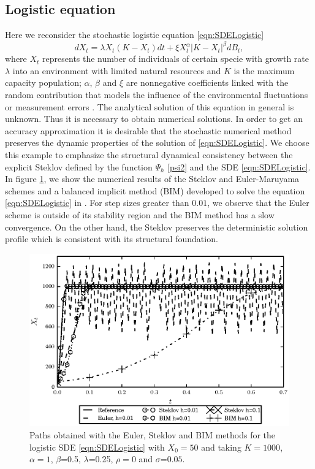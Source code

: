 \subsection{Logistic equation}
  Here we reconsider the stochastic logistic  equation \eqref{eqn:SDELogistic}
  \begin{equation*}
    dX_t= \lambda X_t(K-X_t)dt+ \xi X_t^\alpha|K-X_t|^\beta dB_t,
  \end{equation*}
  where $X_t$  represents the number of individuals of certain specie with growth rate
  $\lambda$ into an environment with limited  natural resources and $K$ is the maximum
  capacity population; $\alpha$, $\beta$ and $\xi$ are nonnegative coefficients linked
  with the random contribution that models the influence of the environmental fluctuations
  or measurement errors \cite{Pasquali2001,Schurz2007,Sun2008}. The analytical solution of
  this equation in general is unknown. Thus it is necessary to obtain  numerical
  solutions. In order to get an accuracy approximation it is desirable that the stochastic
  numerical method  preserves the dynamic properties of the solution of
  \eqref{eqn:SDELogistic}. We choose this example to emphasize the structural dynamical
  consistency between the explicit Steklov defined by the function $\Psi_h$ \eqref{psi2}
  and the SDE \eqref{eqn:SDELogistic}. In figure \ref{fig:PathsEDELog}, we  
  show the numerical results of the  Steklov and Euler-Maruyama schemes and a
  balanced implicit method (BIM) developed to solve the equation \eqref{eqn:SDELogistic} in 
  \cite{Schurz2007}. For step sizes greater than $\num{0.01}$,
  we observe that the Euler scheme is outside of its stability region and the BIM method has
  a slow convergence. On the other hand,
  the Steklov preserves the deterministic solution profile which is consistent with its
  structural foundation.
  \begin{figure}[h!]
    \hspace*{-0.2cm}\includegraphics{./papers/paperA/figures/fig1.eps}
    \caption{
      Paths obtained with the Euler, Steklov and BIM methods for the logistic SDE 
      \eqref{eqn:SDELogistic} with $X_0=50$ and taking $K=1000$,
      $\alpha=1$, $\beta$=0.5, $\lambda$=0.25, $\rho=0$ and $\sigma$=$\num{0.05}$.%
    }\label{fig:PathsEDELog}%
  \end{figure}
